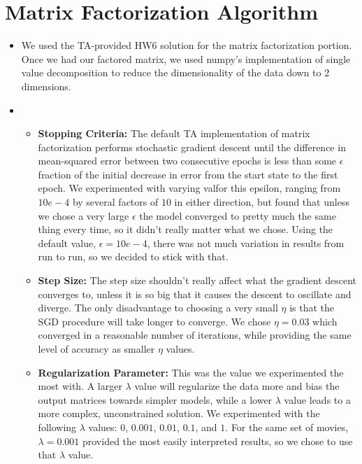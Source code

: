 \pagebreak
\section{Matrix Factorization Algorithm}
\medskip
\begin{itemize}

    \item {}
    We used the TA-provided HW6 solution for the matrix factorization portion. Once
    we had our factored matrix, we used numpy's implementation of single value decomposition
    to reduce the dimensionality of the data down to 2 dimensions.

    \item {} \\

    \begin{itemize}
    \item \textbf{Stopping Criteria:} The default TA implementation of matrix factorization performs stochastic
    gradient descent until the difference in mean-squared error between two
    consecutive epochs is less than some $\epsilon$ fraction of the initial
    decrease in error from the start state to the first epoch. We experimented
    with varying val\pagebreakues for this epsilon, ranging from $10e-4$ by several factors of
    $10$ in either direction, but found that unless we chose a very
    large $\epsilon$ the model converged to pretty much the same thing every time,
    so it didn't really matter what we chose. Using the default value, $\epsilon = 10e-4$,
    there was not much variation in results from run to run, so we decided to stick
    with that.

    \item \textbf{Step Size:} The step size shouldn't really affect what the
    gradient descent converges to, unless it is so big that it causes the descent
    to oscillate and diverge. The only disadvantage to choosing a very small
    $\eta$ is that the SGD procedure will take longer to converge. We chose
    $\eta = 0.03$ which converged in a reasonable number of iterations, while
    providing the same level of accuracy as smaller $\eta$ values.

    \item \textbf{Regularization Parameter:} This was the value we experimented
    the most with. A larger $\lambda$ value will regularize the data more and bias
    the output matrices towards simpler models, while a lower $\lambda$ value leads
    to a more complex, unconstrained solution. We experimented with the following
    $\lambda$ values: $0$, $0.001$, $0.01$, $0.1$, and $1$. For the same set of
    movies, $\lambda = 0.001$ provided the most easily interpreted results, so
    we chose to use that $\lambda$ value.
    \end{itemize}


\end{itemize}
